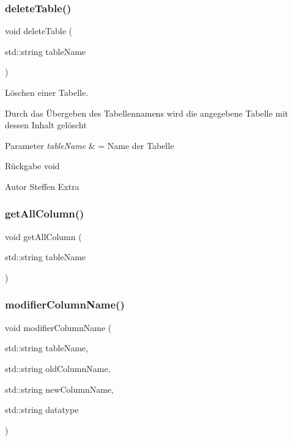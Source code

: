 \mbox{\label{tables_8hpp_a9754762b2c19711bf3dcbfceca61d97d}} 
\subsubsection{delete\+Table()}
{\footnotesize\ttfamily void delete\+Table (\begin{DoxyParamCaption}\item[{std\+::string}]{table\+Name }\end{DoxyParamCaption})}



Löschen einer Tabelle. 

Durch das Übergeben des Tabellennamens wird die angegebene Tabelle mit dessen Inhalt gelöscht


\begin{DoxyParams}{Parameter}
{\em table\+Name} & = Name der Tabelle\\
\hline
\end{DoxyParams}
\begin{DoxyReturn}{Rückgabe}
void
\end{DoxyReturn}
\begin{DoxyAuthor}{Autor}
Steffen Extra 
\end{DoxyAuthor}
\mbox{\label{tables_8hpp_aceb780082d3f7392e485cac394d6c606}} 
\subsubsection{get\+All\+Column()}
{\footnotesize\ttfamily void get\+All\+Column (\begin{DoxyParamCaption}\item[{std\+::string}]{table\+Name }\end{DoxyParamCaption})}

\mbox{\label{tables_8hpp_a244b10b3b373f8a174943176101a480f}} 
\subsubsection{modifier\+Column\+Name()}
{\footnotesize\ttfamily void modifier\+Column\+Name (\begin{DoxyParamCaption}\item[{std\+::string}]{table\+Name,  }\item[{std\+::string}]{old\+Column\+Name,  }\item[{std\+::string}]{new\+Column\+Name,  }\item[{std\+::string}]{datatype }\end{DoxyParamCaption})}



